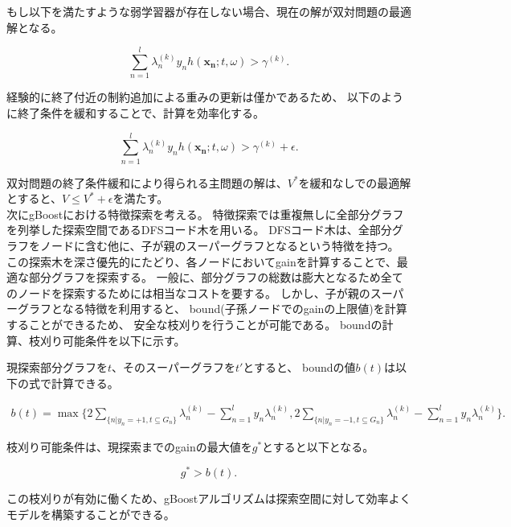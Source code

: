 もし以下を満たすような弱学習器が存在しない場合、現在の解が双対問題の最適解となる。

\begin{equation*}
	\sum_{n=1}^{l} \lambda_{n}^{(k)} y_{n} h(\bm{x_{n}} ; t, \omega) > \gamma^{(k)}.
\end{equation*}

経験的に終了付近の制約追加による重みの更新は僅かであるため、
以下のように終了条件を緩和することで、計算を効率化する。

\begin{equation*}
	\sum_{n=1}^{l} \lambda_{n}^{(k)} y_{n} h(\bm{x_{n}} ; t, \omega) > \gamma^{(k)} + \epsilon .
\end{equation*}

双対問題の終了条件緩和により得られる主問題の解は、$V^*$を緩和なしでの最適解とすると、$V \leq V^* + \epsilon$を満たす。\\

次にgBoostにおける特徴探索を考える。
特徴探索では重複無しに全部分グラフを列挙した探索空間であるDFSコード木\cite{gSpan}を用いる。
DFSコード木は、全部分グラフをノードに含む他に、子が親のスーパーグラフとなるという特徴を持つ。
この探索木を深さ優先的にたどり、各ノードにおいてgainを計算することで、最適な部分グラフを探索する。
一般に、部分グラフの総数は膨大となるため全てのノードを探索するためには相当なコストを要する。
しかし、子が親のスーパーグラフとなる特徴を利用すると、
bound(子孫ノードでのgainの上限値)を計算することができるため、
安全な枝刈りを行うことが可能である。
boundの計算、枝刈り可能条件を以下に示す。

現探索部分グラフを$t$、そのスーパーグラフを$t'$とすると、
boundの値$b(t)$は以下の式で計算できる。

\begin{align}
	b(t) = \max\{2 \sum_{\{n|y_{n}=+1, t \subseteq G_{n}\}} \lambda_{n}^{(k)} - \sum_{n=1}^{l} y_{n} \lambda_{n}^{(k)},	2 \sum_{\{n|y_{n}=-1, t \subseteq G_{n}\}} \lambda_{n}^{(k)} - \sum_{n=1}^{l} y_{n} \lambda_{n}^{(k)}\}.
	\label{eq:bound}
\end{align}

枝刈り可能条件は、現探索までのgainの最大値を$g^{*}$とすると以下となる。

\begin{equation*}
	g^{*} > b(t).
\end{equation*}

この枝刈りが有効に働くため、gBoostアルゴリズムは探索空間に対して効率よくモデルを構築することができる。
